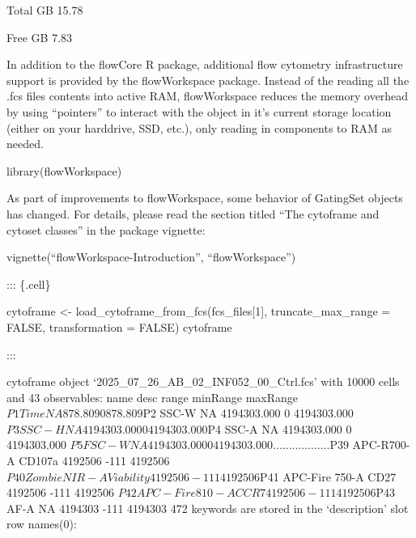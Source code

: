 \documentclass[
  letterpaper,
  DIV=11,
  numbers=noendperiod]{scrartcl}
\newenvironment{Shaded}{\begin{snugshade}}{\end{snugshade}}
\newcommand{\AttributeTok}[1]{\textcolor[rgb]{0.40,0.45,0.13}{#1}}
\newcommand{\ConstantTok}[1]{\textcolor[rgb]{0.56,0.35,0.01}{#1}}
\newcommand{\DecValTok}[1]{\textcolor[rgb]{0.68,0.00,0.00}{#1}}
\newcommand{\FunctionTok}[1]{\textcolor[rgb]{0.28,0.35,0.67}{#1}}
\newcommand{\NormalTok}[1]{\textcolor[rgb]{0.00,0.23,0.31}{#1}}
\newcommand{\OtherTok}[1]{\textcolor[rgb]{0.00,0.23,0.31}{#1}}
\newcommand{\SpecialCharTok}[1]{\textcolor[rgb]{0.37,0.37,0.37}{#1}}
\newcommand{\StringTok}[1]{\textcolor[rgb]{0.13,0.47,0.30}{#1}}
\begin{document}
Total GB 15.78

\begin{Shaded}
\end{Shaded}

Free GB 7.83

In addition to the flowCore R package, additional flow cytometry
infrastructure support is provided by the flowWorkspace package. Instead
of the reading all the .fcs files contents into active RAM,
flowWorkspace reduces the memory overhead by using ``pointers'' to
interact with the object in it's current storage location (either on
your harddrive, SSD, etc.), only reading in components to RAM as needed.

\begin{Shaded}
\begin{Highlighting}[]
\FunctionTok{library}\NormalTok{(flowWorkspace)}
\end{Highlighting}
\end{Shaded}

As part of improvements to flowWorkspace, some behavior of GatingSet
objects has changed. For details, please read the section titled ``The
cytoframe and cytoset classes'' in the package vignette:

vignette(``flowWorkspace-Introduction'', ``flowWorkspace'')

::: \{.cell\}

\begin{Shaded}
\begin{Highlighting}[]
\NormalTok{cytoframe }\OtherTok{\textless{}{-}} \FunctionTok{load\_cytoframe\_from\_fcs}\NormalTok{(fcs\_files[}\DecValTok{1}\NormalTok{], }\AttributeTok{truncate\_max\_range =} \ConstantTok{FALSE}\NormalTok{, }\AttributeTok{transformation =} \ConstantTok{FALSE}\NormalTok{)}
\NormalTok{cytoframe}
\end{Highlighting}
\end{Shaded}

:::

cytoframe object `2025\_07\_26\_AB\_02\_INF052\_00\_Ctrl.fcs' with 10000
cells and 43 observables: name desc range minRange maxRange
\(P1            Time        NA     878.809         0     878.809\)P2
SSC-W NA 4194303.000 0 4194303.000
\(P3           SSC-H        NA 4194303.000         0 4194303.000\)P4
SSC-A NA 4194303.000 0 4194303.000
\(P5           FSC-W        NA 4194303.000         0 4194303.000
...             ...       ...         ...       ...         ...\)P39
APC-R700-A CD107a 4192506 -111 4192506
\(P40   Zombie NIR-A Viability     4192506      -111     4192506\)P41
APC-Fire 750-A CD27 4192506 -111 4192506
\(P42 APC-Fire 810-A      CCR7     4192506      -111     4192506\)P43
AF-A NA 4194303 -111 4194303 472 keywords are stored in the
`description' slot row names(0):
\end{document}
